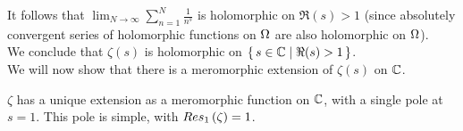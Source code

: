 It follows that $\lim_{N \to \infty} \sum_{n=1}^N \frac{1}{n^s}$ is holomorphic on $\Re(s) > 1$ (since absolutely convergent series of holomorphic functions on $\Omega$ are also holomorphic on $\Omega$).\\

We conclude that $\zeta(s)$ is holomorphic on $\set{s \in \mathbb{C}\mid \Re(s) >1 }$.\\

We will now show that there is a meromorphic extension of $\zeta(s)$ on $\mathbb{C}$.

\begin{theorem}[Riemann]
$\zeta$ has a unique extension as a meromorphic function on $\mathbb{C}$, with a single pole at $s=1$. This pole is simple, with $Res_{1} \left( \zeta \right) = 1$.
\end{theorem}

